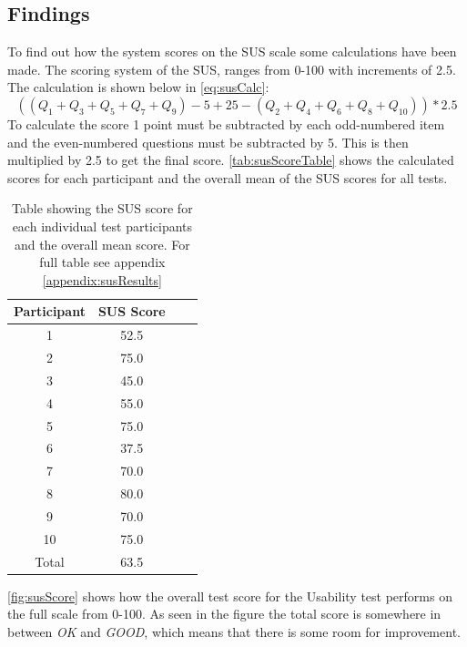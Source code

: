 \subsection{Findings}
To find out how the system scores on the SUS scale some calculations have been made. The scoring system of the SUS, ranges from 0-100 with increments of 2.5. The calculation is shown below in \autoref{eq:susCalc}:
\begin{equation} \label{eq:susCalc}
( (Q_1+Q_3+Q_5+Q_7+Q_9)-5+25-(Q_2+Q_4+Q_6+Q_8+Q_{10}) )*2.5
\end{equation}
\linebreak
To calculate the score 1 point must be subtracted by each odd-numbered item and the even-numbered questions must be subtracted by 5. This is then multiplied by 2.5 to get the final score. \autoref{tab:susScoreTable} shows the calculated scores for each participant and the overall mean of the SUS scores for all tests.

\begin{table}[H]
	\centering
	\caption{Table showing the SUS score for each individual test participants and the overall mean score. For full table see appendix \ref{appendix:susResults}}
	\label{tab:susScoreTable}
	\begin{tabular}{|c|c|l|l|}
		\hline
		Participant & SUS Score \\ \hline
		1           & 52.5      \\ \hline
		2           & 75.0      \\ \hline
		3           & 45.0      \\ \hline
		4           & 55.0      \\ \hline
		5           & 75.0      \\ \hline
		6           & 37.5      \\ \hline
		7           & 70.0      \\ \hline
		8           & 80.0      \\ \hline
		9           & 70.0      \\ \hline
		10          & 75.0      \\ \hline
		Total       & 63.5      \\ \hline
	\end{tabular}
\end{table}

\autoref{fig:susScore} shows how the overall test score for the Usability test performs on the full scale from 0-100. As seen in the figure the total score is somewhere in between \textit{OK} and \textit{GOOD}, which means that there is some room for improvement.

